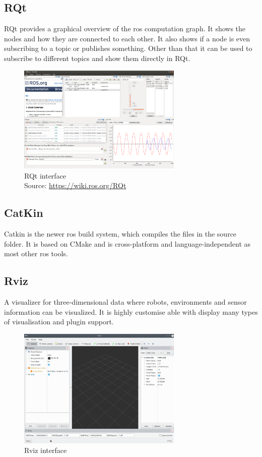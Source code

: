 \subsection{RQt}
RQt provides a graphical overview of the \gls{ros} computation graph. It shows the nodes and how they are connected to each other. It also shows if a node is even subscribing to a topic or publishes something. Other than that it can be used to subscribe to different topics and show them directly in RQt.
\begin{figure}[h]
	\centering
	\includegraphics[width=0.7\textwidth]{./media/images/RQt}
  	\caption{RQt interface\\Source: \url{https://wiki.ros.org/RQt}}
  	\label{rqtinterface}
\end{figure}

\subsection{CatKin}
Catkin is the newer \gls{ros} build system, which compiles the files in the source folder. It is based on CMake and is cross-platform and language-independent as most other \gls{ros} tools.

\subsection{Rviz}
A visualizer for three-dimensional data where robots, environments and sensor information can be visualized. It is highly customise able with display many types of visualisation and plugin support. \newline
\begin{figure}[h]
	\centering
	\includegraphics[width=0.7\textwidth]{./media/images/rviz}
  	\caption{Rviz interface}
  	\label{rvizinterface}
\end{figure}

